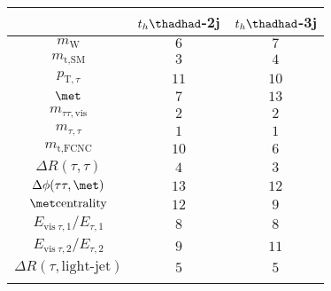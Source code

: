 \centering
\begin{tabular}{ccc} \toprule\toprule
 & $t_h\thadhad$-2j & $t_h\thadhad$-3j\\\midrule
$m_{\text{W}}$                               & $6$    & $7$\\
$m_{\text{t},\text{SM}}$                     & $3$    & $4$\\
$p_{\text{T},\tau }$                         & $11$   & $10$\\
$\met$                                       & $7$    & $13$\\
$m_{\tau\tau,\text{vis}}$                    & $2$    & $2$\\
$m_{\tau ,\tau }$                            & $1$    & $1$\\
$m_{\text{t},\text{FCNC}}$                   & $10$   & $6$\\
$\Delta R(\tau,\tau)$                        & $4$    & $3$\\
$\Delta\phi(\tau\tau,\met)$                  & $13$   & $12$\\
$\met \text{centrality}$                     & $12$   & $9$\\
$E_{\text{vis}~\tau ,1}/E_{\tau ,1}$         & $8$    & $8$\\
$E_{\text{vis}~\tau ,2}/E_{\tau ,2}$         & $9$    & $11$\\
$\Delta R(\tau,\text{light-jet})$            & $5$    & $5$\\
\bottomrule\bottomrule\\
\end{tabular}
